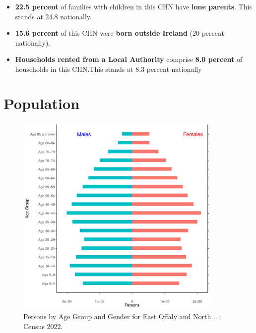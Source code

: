 \documentclass{article}
\begin{document}
\begin{itemize}
\item \textbf{22.5 percent} of families with children in this CHN have \textbf{lone parents}. This stands at 24.8 nationally.

\item \textbf{15.6 percent} of this CHN were \textbf{born outside Ireland} (20 percent nationally).

\item \textbf{Households rented from a Local Authority} comprise \textbf{8.0 percent} of households in this CHN.This stands at 8.3 percent nationally

\end{itemize}

\pagebreak

\section{Population} 
\label{sect:Pop}

\begin{figure}[h]
	\centering
	\includegraphics[width = 100mm]{../figures/PyramidPlot.pdf}
	\caption{Persons by Age Group and Gender for East Offaly and North ...; Census 2022.}
	\label{fig:2ae19629-1a6a-13a3-e055-000000000001}
	\end{figure}
\end{document}
